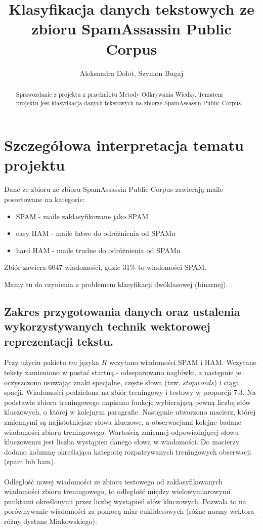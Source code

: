 \documentclass[fleqn]{article}
\begin{document}
\title{Klasyfikacja danych tekstowych ze zbioru SpamAssassin Public Corpus}
\author{Aleksnadra Dolot, Szymon Bugaj}

\maketitle

\begin{abstract}
Sprawozdanie z projektu z przedmiotu Metody Odkrywania Wiedzy.
Tematem projektu jest klasyfikacja danych tekstowych na zbiorze SpamAssassin Public Corpus.
\end{abstract}

\tableofcontents


\section{Szczegółowa interpretacja tematu projektu}
Dane ze zbioru ze zbioru SpamAssassin Public Corpus zawierają maile posortowane na kategorie:
\begin{itemize}
    \item SPAM     - maile zaklasyfikowane jako SPAM
    \item easy HAM - maile łatwe do odróżnienia od SPAMu
    \item hard HAM - maile trudne do odróżnienia od SPAMu
\end{itemize}

Zbiór zawiera 6047 wiadomości, gdzie 31\% to wiadomości SPAM.

Mamy tu do czynienia z problemem klasyfikacji dwóklasowej (binarnej).

\subsection{Zakres przygotowania danych oraz ustalenia wykorzystywanych technik wektorowej reprezentacji tekstu.}

Przy użyciu pakietu $tm$ języka $R$ wczytano wiadomości SPAM i HAM. Wczytane teksty zamieniono w postać startną - odseparowano nagłówki, a następnie je oczyszczono usuwając znaki specjalne, częste słowa (tzw. $stopwords$) i ciągi spacji. Wiadomości podzielona na zbiór treningowy i testowy w proporcji 7:3. Na podstawie zbioru treningowego napisnao funkcję wybierającą pewną liczbę słów kluczowych, o której w kolejnym paragrafie. Następnie utworzono macierz, której zmiennymi są najistotniejsze słowa kluczowe, a obserwacjami kolejne badane wiadomości zbioru treningowego. Wartością zmiennej odpowiadającej słowu kluczowemu jest liczba wystąpien danego słowa w wiadomości. Do macierzy dodano kolumnę określająca kategorię rozpatrywanych treningowych obserwacji (spam lub ham). 
\\ \\
Odległość nowej wiadomości ze zbioru testowego od zaklasyfikowanych wiadomości zbioru treningowego, to odległość między wielowymiarowymi punktami określonymi przez liczbę wystąpień słów kluczowych. Pozwala to na porównywanie wiadomości za pomocą miar euklidesowych (różne normy wektora - różny dystans Minkowskiego).
\end{document}
